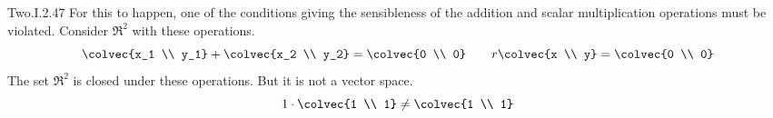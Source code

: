 \begin{ans}{Two.I.2.47}
      For this to happen, one of the conditions giving the sensibleness of the
      addition and scalar multiplication operations must be violated.
      Consider \( \Re^2 \) with these operations.
      \begin{equation*}
        \colvec{x_1 \\ y_1}
        +\colvec{x_2 \\ y_2}
        =\colvec{0 \\ 0}
        \qquad
        r\colvec{x \\ y}
        =\colvec{0 \\ 0}
      \end{equation*}
      The set $\Re^2$ is closed under these operations.
      But it is not a vector space.
      \begin{equation*}
        1\cdot\colvec{1 \\ 1}
        \neq\colvec{1 \\ 1}
      \end{equation*}
    
\end{ans}
